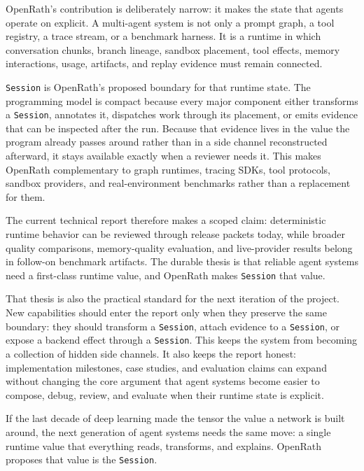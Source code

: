 
OpenRath's contribution is deliberately narrow: it makes the state that agents
operate on explicit. A multi-agent system is not only a prompt graph, a tool
registry, a trace stream, or a benchmark harness. It is a runtime in which
conversation chunks, branch lineage, sandbox placement, tool effects, memory
interactions, usage, artifacts, and replay evidence must remain connected.

\texttt{Session} is OpenRath's proposed boundary for that runtime state. The
programming model is compact because every major component either transforms a
\texttt{Session}, annotates it, dispatches work through its placement, or emits
evidence that can be inspected after the run. Because that evidence lives in the
value the program already passes around rather than in a side channel
reconstructed afterward, it stays available exactly when a reviewer needs it.
This makes OpenRath complementary to graph runtimes, tracing SDKs, tool
protocols, sandbox providers, and real-environment benchmarks rather than a
replacement for them.

The current technical report therefore makes a scoped claim: deterministic
runtime behavior can be reviewed through release packets today, while broader
quality comparisons, memory-quality evaluation, and live-provider results
belong in follow-on benchmark artifacts. The durable thesis is that reliable
agent systems need a first-class runtime value, and OpenRath makes
\texttt{Session} that value.

That thesis is also the practical standard for the next iteration of the
project. New capabilities should enter the report only when they preserve the
same boundary: they should transform a \texttt{Session}, attach evidence to a
\texttt{Session}, or expose a backend effect through a \texttt{Session}. This
keeps the system from becoming a collection of hidden side channels. It also
keeps the report honest: implementation milestones, case studies, and
evaluation claims can expand without changing the core argument that agent
systems become easier to compose, debug, review, and evaluate when their
runtime state is explicit.

If the last decade of deep learning made the tensor the value a network is
built around, the next generation of agent systems needs the same move: a
single runtime value that everything reads, transforms, and explains. OpenRath
proposes that value is the \texttt{Session}.
